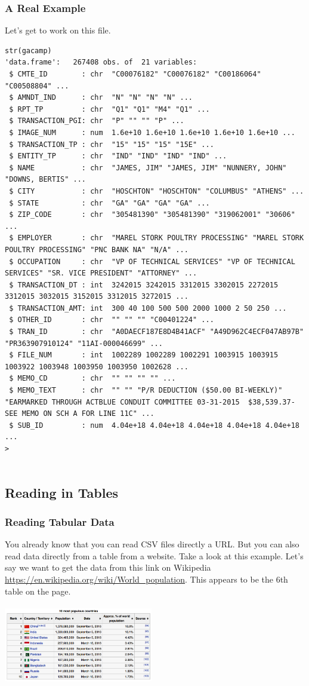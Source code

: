 \documentclass{beamer}
\begin{document}
\begin{frame}[fragile]
\frametitle{A Real Example}Let's get to work on this file.
\tiny
\begin{verbatim}
str(gacamp)
'data.frame':	267408 obs. of  21 variables:
 $ CMTE_ID        : chr  "C00076182" "C00076182" "C00186064" "C00508804" ...
 $ AMNDT_IND      : chr  "N" "N" "N" "N" ...
 $ RPT_TP         : chr  "Q1" "Q1" "M4" "Q1" ...
 $ TRANSACTION_PGI: chr  "P" "" "" "P" ...
 $ IMAGE_NUM      : num  1.6e+10 1.6e+10 1.6e+10 1.6e+10 1.6e+10 ...
 $ TRANSACTION_TP : chr  "15" "15" "15" "15E" ...
 $ ENTITY_TP      : chr  "IND" "IND" "IND" "IND" ...
 $ NAME           : chr  "JAMES, JIM" "JAMES, JIM" "NUNNERY, JOHN" "DOWNS, BERTIS" ...
 $ CITY           : chr  "HOSCHTON" "HOSCHTON" "COLUMBUS" "ATHENS" ...
 $ STATE          : chr  "GA" "GA" "GA" "GA" ...
 $ ZIP_CODE       : chr  "305481390" "305481390" "319062001" "30606" ...
 $ EMPLOYER       : chr  "MAREL STORK POULTRY PROCESSING" "MAREL STORK POULTRY PROCESSING" "PNC BANK NA" "N/A" ...
 $ OCCUPATION     : chr  "VP OF TECHNICAL SERVICES" "VP OF TECHNICAL SERVICES" "SR. VICE PRESIDENT" "ATTORNEY" ...
 $ TRANSACTION_DT : int  3242015 3242015 3312015 3302015 2272015 3312015 3032015 3152015 3312015 3272015 ...
 $ TRANSACTION_AMT: int  300 40 100 500 500 2000 1000 2 50 250 ...
 $ OTHER_ID       : chr  "" "" "" "C00401224" ...
 $ TRAN_ID        : chr  "A0DAECF187E8D4B41ACF" "A49D962C4ECF047AB97B" "PR363907910124" "11AI-000046699" ...
 $ FILE_NUM       : int  1002289 1002289 1002291 1003915 1003915 1003922 1003948 1003950 1003950 1002628 ...
 $ MEMO_CD        : chr  "" "" "" "" ...
 $ MEMO_TEXT      : chr  "" "" "P/R DEDUCTION ($50.00 BI-WEEKLY)" "EARMARKED THROUGH ACTBLUE CONDUIT COMMITTEE 03-31-2015  $38,539.37-SEE MEMO ON SCH A FOR LINE 11C" ...
 $ SUB_ID         : num  4.04e+18 4.04e+18 4.04e+18 4.04e+18 4.04e+18 ...
> 


\end{verbatim}
\end{frame}


\subsection{Reading in Tables}
\begin{frame}[fragile]
\frametitle{Reading Tabular Data}
\small
You already know that you can read CSV files directly a URL. But you can also read data directly from a table from a website. Take a look at this example. Let's say we want to get the data from this link on Wikipedia \url{https://en.wikipedia.org/wiki/World_population}. This appears to be the 6th table on the page. 
\begin{center}
\includegraphics[height=3.5cm,width=6.5cm]{../IMG/world_population_wiki.png}
\end{center}
\end{frame}
\end{document}

